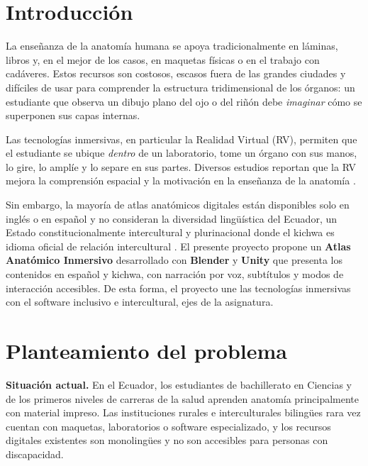 \documentclass[11pt,a4paper]{article}
\begin{document}
\section{Introducción}
La enseñanza de la anatomía humana se apoya tradicionalmente en láminas, libros y, en el mejor de los casos, en maquetas físicas o en el trabajo con cadáveres. Estos recursos son costosos, escasos fuera de las grandes ciudades y difíciles de usar para comprender la estructura tridimensional de los órganos: un estudiante que observa un dibujo plano del ojo o del riñón debe \emph{imaginar} cómo se superponen sus capas internas.

Las tecnologías inmersivas, en particular la Realidad Virtual (RV), permiten que el estudiante se ubique \emph{dentro} de un laboratorio, tome un órgano con sus manos, lo gire, lo amplíe y lo separe en sus partes. Diversos estudios reportan que la RV mejora la comprensión espacial y la motivación en la enseñanza de la anatomía \cite{moro2017}.

Sin embargo, la mayoría de atlas anatómicos digitales están disponibles solo en inglés o en español y no consideran la diversidad lingüística del Ecuador, un Estado constitucionalmente intercultural y plurinacional donde el kichwa es idioma oficial de relación intercultural \cite{constitucion}. El presente proyecto propone un \textbf{Atlas Anatómico Inmersivo} desarrollado con \textbf{Blender} y \textbf{Unity} que presenta los contenidos en español y kichwa, con narración por voz, subtítulos y modos de interacción accesibles. De esta forma, el proyecto une las tecnologías inmersivas con el software inclusivo e intercultural, ejes de la asignatura.

\section{Planteamiento del problema}
\textbf{Situación actual.} En el Ecuador, los estudiantes de bachillerato en Ciencias y de los primeros niveles de carreras de la salud aprenden anatomía principalmente con material impreso. Las instituciones rurales e interculturales bilingües rara vez cuentan con maquetas, laboratorios o software especializado, y los recursos digitales existentes son monolingües y no son accesibles para personas con discapacidad.
\end{document}
